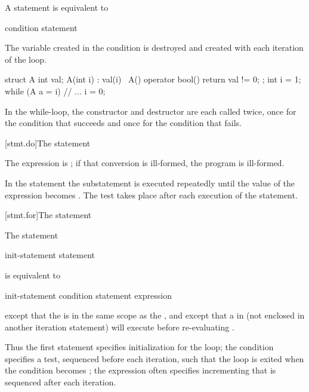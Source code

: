\pnum
{}%
A  statement is equivalent to
\begin{ncsimplebnf}
 \terminal{:}\br
\terminal{\{}\br
\bnfindent {} \terminal{(} condition \terminal{)} \terminal{\{}\br
\bnfindent \bnfindent statement\br
\bnfindent \bnfindent {}  \terminal{;}\br
\bnfindent \terminal{\}}\br
\terminal{\}}
\end{ncsimplebnf}
\begin{note}
The variable created in the condition is destroyed and created with each
iteration of the loop.
\begin{example}
\begin{codeblock}
struct A {
  int val;
  A(int i) : val(i) { }
  ~A() { }
  operator bool() { return val != 0; }
};
int i = 1;
while (A a = i) {
  // ...
  i = 0;
}
\end{codeblock}
In the while-loop, the constructor and destructor are each called twice,
once for the condition that succeeds and once for the condition that
fails.
\end{example}
\end{note}

[stmt.do]{The  statement}%

\pnum
The expression is ;
if that conversion is ill-formed, the program is ill-formed.

\pnum
In the  statement the substatement is executed repeatedly
until the value of the expression becomes . The test takes
place after each execution of the statement.

[stmt.for]{The  statement}%

\pnum
The  statement
\begin{ncsimplebnf}
 \terminal{(} init-statement  \terminal{;}  \terminal{)} statement
\end{ncsimplebnf}
is equivalent to
\begin{ncsimplebnf}
\terminal{\{}\br
\bnfindent init-statement\br
\bnfindent {} \terminal{(} condition \terminal{)} \terminal{\{}\br
\bnfindent\bnfindent statement\br
\bnfindent\bnfindent expression \terminal{;}\br
\bnfindent \terminal{\}}\br
\terminal{\}}
\end{ncsimplebnf}
except that the  is
in the same scope as the , and
except that a
%
 in  (not enclosed in another
iteration statement) will execute  before
re-evaluating .
\begin{note}
Thus the first statement specifies initialization for the loop; the
condition specifies a test, sequenced before each
iteration, such that the loop is exited when the condition becomes
; the expression often specifies incrementing that is
sequenced after each iteration.
\end{note}

